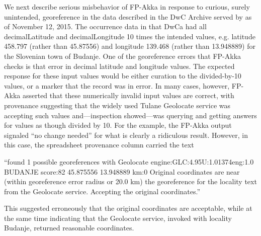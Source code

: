 \documentclass{article}
\begin{document}
We next describe serious misbehavior of FP-Akka in response to curious, surely unintended, georeference in the data described in 
the DwC Archive served by \citep{SpiderDiversityCorrigendum2015} as of November 12, 2015. 
The occurrence data in that DwCa had all decimalLatitude and decimalLongitude 10 times the intended values, e.g. latitude 458.797 (rather than 45.87556) and longitude 139.468 (rather than 13.948889) for the Slovenian town of Budanje.  
One of the georeference errors that FP-Akka checks is 
that error in decimal latitude and longitude values.
The expected response for these input values would be either curation to the divided-by-10 values, or a marker that the record was in error.  In many cases, however, FP-Akka asserted that these numerically invalid input values are correct, with provenance suggesting that the widely used Tulane Geolocate service was accepting such values and---inspection showed---was querying and getting answers for values as though divided by 10.  For the example, the FP-Akka output signaled ``no change needed'' for what is clearly a ridiculous result. However, in this case, the spreadsheet provenance column carried the text 

``\sffamily found 1 possible georeferences with Geolocate engine:GLC:4.95\textbar U:1.01374\textbar eng:1.0 \textbar BUDANJE score:82 45.875556 13.948889 km:0 \textbar Original coordinates are near (within georeference error radius or 20.0 km) the georeference for the locality text from the Geolocate service.  Accepting the original coordinates.\rmfamily'' 

This suggested erroneously that the original coordinates are acceptable, while at the same time indicating that the Geolocate service, invoked with locality Budanje, returned reasonable coordinates. 
\end{document}
